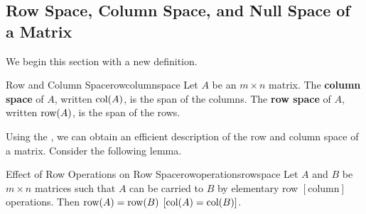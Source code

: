 \subsection{Row Space, Column Space, and Null Space of a Matrix}

We begin this section with a new definition.

\begin{definition}{Row and Column Space}{rowcolumnspace}
Let $A$ be an $m\times n$ matrix. The \textbf{column space} of $A$, written $\mbox{col}(A)$, is the
span of the columns. The \textbf{row space} of $A$, written $\mbox{row}(A)$, is the span of the rows.
\end{definition}

Using the {\rref}, we can obtain an efficient description of the row and column space of
a matrix. Consider the following lemma.

\begin{lemma}{Effect of Row Operations on Row Space}{rowoperationsrowspace}
Let $A$ and $B$ be $m\times n$ matrices such that $A$ can be carried to $B$ by elementary row $\left[ \mbox{column} \right]$ operations. Then $\mbox{row}(A)=\mbox{row}(B)$ $\left[\mbox{col}(A)=\mbox{col}(B) \right]$.
\end{lemma}

